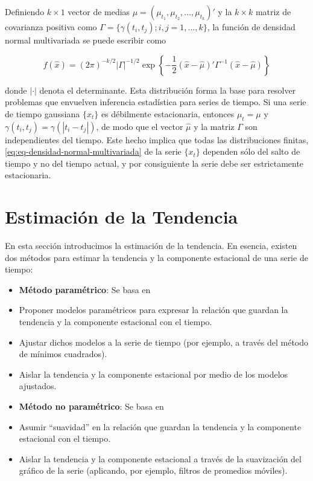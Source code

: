 \documentclass[12pt,]{krantz}
\providecommand{\tightlist}{%
  \setlength{\itemsep}{0pt}\setlength{\parskip}{0pt}}
\theoremstyle{definition}
\theoremstyle{definition}
\theoremstyle{definition}
\theoremstyle{remark}
\begin{document}
Definiendo \(k\times1\) vector de medias
\(\hat{\mu}=(\mu_{t_1},\mu_{t_2},\ldots,\mu_{t_k})'\) y la \(k\times k\)
matriz de covarianza positiva como
\(\Gamma=\{\gamma(t_i,t_j);i,j=1,\ldots,k\}\), la función de densidad
normal multivariada se puede escribir como

\begin{equation}
f(\hat{x})=(2\pi)^{-k/2}|\Gamma|^{-1/2}\exp\left\{-\frac{1}{2}(\hat{x}-\hat{\mu})'\Gamma^{-1}(\hat{x}-\hat{\mu})\right\}
\label{eq:eq-densidad-normal-multivariada}
\end{equation}

donde \(|\cdot|\) denota el determinante. Esta distribución forma la
base para resolver problemas que envuelven inferencia estadística para
series de tiempo. Si una serie de tiempo gaussiana \(\{x_t\}\) es
débilmente estacionaria, entonces \(\mu_t=\mu\) y
\(\gamma(t_i,t_j)=\gamma(|t_i-t_j|)\), de modo que el vector
\(\hat{\mu}\) y la matriz \(\Gamma\) son independientes del tiempo. Este
hecho implica que todas las distribuciones finitas,
\eqref{eq:eq-densidad-normal-multivariada} de la serie \(\{x_t\}\)
dependen sólo del salto de tiempo y no del tiempo actual, y por
consiguiente la serie debe ser estrictamente estacionaria.

\section{Estimación de la Tendencia}\label{estimacion-de-la-tendencia}

En esta sección introducimos la estimación de la tendencia. En esencia,
existen dos métodos para estimar la tendencia y la componente estacional
de una serie de tiempo:

\begin{itemize}
\tightlist
\item
  \textbf{Método paramétrico}: Se basa en
\item
  Proponer modelos paramétricos para expresar la relación que guardan la
  tendencia y la componente estacional con el tiempo.
\item
  Ajustar dichos modelos a la serie de tiempo (por ejemplo, a través del
  método de mínimos cuadrados).
\item
  Aislar la tendencia y la componente estacional por medio de los
  modelos ajustados.
\item
  \textbf{Método no paramétrico}: Se basa en
\item
  Asumir ``suavidad'' en la relación que guardan la tendencia y la
  componente estacional con el tiempo.
\item
  Aislar la tendencia y la componente estacional a través de la
  suavización del gráfico de la serie (aplicando, por ejemplo, filtros
  de promedios móviles).
\end{itemize}
\end{document}
